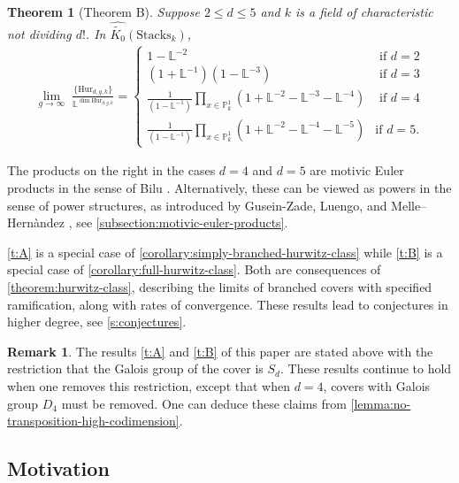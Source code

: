 \documentclass[12 pt]{amsart}
\theoremstyle{plain}
\newtheorem{theorem}[subsection]{Theorem}
\theoremstyle{definition}
\newtheorem{remark}[theorem]{Remark}
\theoremstyle{remark}
\numberwithin{equation}{section}
\newcommand\bl{\mathbb L}
\newcommand\bp{\mathbb P}
\newcommand\hur[3]{\mathrm{Hur}_{#1,#2,#3}} %
\newcommand\grcSpaces{\widehat{\widetilde{K_0}}(\mathrm{Spaces}_k)} %
\newcommand\grcStacks{\widehat{\widetilde{K_0}}(\mathrm{Stacks}_k)} %
\begin{document}
\begin{theorem}[Theorem B]  \label{t:B}Suppose $2 \leq d \leq 5$ and $k$ is a
	field of
	characteristic not dividing $d!$.  In
	$\grcStacks$, \begin{align*} \lim_{g \rightarrow \infty} \; \frac {
		\{\hur d g k\}} {\bl^{ \dim \hur d g k}} = \begin{cases}
			1-\bl^{-2}	 & \text{ if } d = 2 \\ (1+\bl^{-1})
			\left( 1 - \bl^{-3} \right) & \text{ if } d = 3 \\ \frac
			1 {(1-\bl^{-1})} \prod_{x \in \bp^1_k} \left(1+\bl^{-2}
			- \bl^{-3} - \bl^{-4} \right) & \text{ if } d= 4 \\
			\frac 1 {(1-\bl^{-1})} \prod_{x \in \bp^1_k}
			\left(1+\bl^{-2}- \bl^{-4} - \bl^{-5} \right) & \text{
if } d = 5.  \end{cases} \end{align*} \end{theorem} 

The products on the right in
the cases $d=4$ and $d=5$ are motivic Euler products in the sense of Bilu
\cite{bilu:thesis, biluH:motivic-euler-products-in-motivic-statistics}.
Alternatively, these can be viewed as powers in the sense of power structures,
as introduced by Gusein-Zade, Luengo, and Melle–Hern\`{a}ndez \cite{Gusein-Zade2004},
see \autoref{subsection:motivic-euler-products}.  
 
\autoref{t:A} is a special case of
\autoref{corollary:simply-branched-hurwitz-class}
while \autoref{t:B} is a special case of \autoref{corollary:full-hurwitz-class}.
Both are consequences of 
\autoref{theorem:hurwitz-class}, describing the limits of branched
covers with specified ramification, along with rates of convergence. 
These results lead to conjectures in higher degree, see
\autoref{s:conjectures}.

\begin{remark}
	\label{remark:}
	The results \autoref{t:A} and \autoref{t:B} 
of this paper are stated above with the restriction that the
Galois group of the cover is $S_d$. 
These results continue to hold when one removes this restriction, except that
when $d = 4$, covers with Galois
group $D_4$ must be removed. One can deduce these claims from
\autoref{lemma:no-transposition-high-codimension}.
\end{remark}



\subsection{Motivation}
\end{document}
